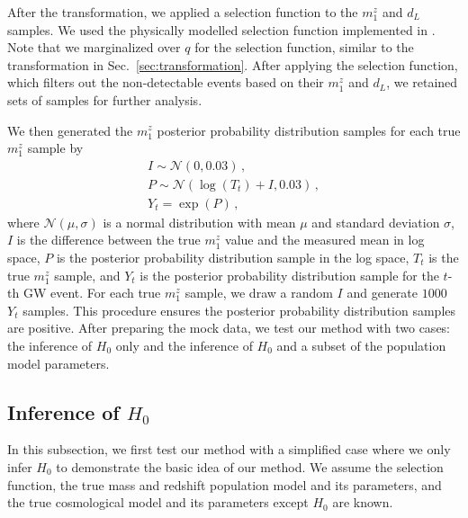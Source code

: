 \documentclass[sn-aps, pdflatex]{sn-jnl}
\begin{document}
After the transformation, we applied a selection function to the $m^z_1$ and $d_L$ samples.
We used the physically modelled selection function implemented in \cite{Lorenzo-Medina:2024opt}.
Note that we marginalized over $q$ for the selection function, similar to the transformation in Sec.~\ref{sec:transformation}.
After applying the selection function, which filters out the non-detectable events based on their $m^z_1$ and $d_L$, we retained  sets of samples for further analysis.

We then generated the $m^z_1$ posterior probability distribution samples for each true $m^z_1$ sample by
\begin{gather*}
    I \sim \mathcal{N}(0, 0.03)\,,\\
    P \sim \mathcal{N}(\log(T_t)+I, 0.03)\,,\\
    Y_t = \exp(P)\,,
\end{gather*}
where $\mathcal{N}(\mu, \sigma)$ is a normal distribution with mean $\mu$ and standard deviation $\sigma$, $I$ is the difference between the true $m^z_1$ value and the measured mean in log space, $P$ is the posterior probability distribution sample in the log space, $T_t$ is the true $m^z_1$ sample, and $Y_t$ is the posterior probability distribution sample for the $t$-th \ac{GW} event.
For each true $m^z_1$ sample, we draw a random $I$ and generate $1000$ $Y_t$ samples.
This procedure ensures the posterior probability distribution samples are positive.
After preparing the mock data, we test our method with two cases: the inference of $H_0$ only and the inference of $H_0$ and a subset of the population model parameters.

\subsection{Inference of $H_0$}
\label{sec:inference_H0}

In this subsection, we first test our method with a simplified case where we only infer $H_0$ to demonstrate the basic idea of our method.
We assume the selection function, the true mass and redshift population model and its parameters, and the true cosmological model and its parameters except $H_0$ are known.
\end{document}
